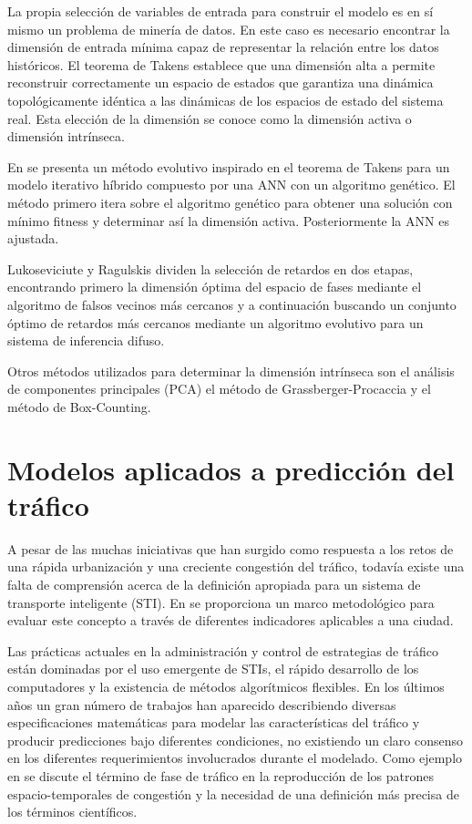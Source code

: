 \documentclass{llncs}
\begin{document}
La propia selección de variables de entrada para construir el modelo es en sí mismo un problema de minería de datos. En este caso es necesario encontrar la dimensión de entrada mínima capaz de representar la relación entre los datos históricos. El teorema de Takens \cite{Takens1981366} establece que una dimensión alta a permite reconstruir correctamente un espacio de estados que garantiza una dinámica topológicamente idéntica a las dinámicas de los espacios de estado del sistema real. Esta elección de la dimensión se conoce como la dimensión activa \cite{Tanaka} o dimensión intrínseca.

En \cite{Ferreira} se presenta un método evolutivo inspirado en el teorema de Takens para un modelo iterativo híbrido compuesto por una ANN con un algoritmo genético. El método primero itera sobre el algoritmo genético para obtener una solución con mínimo fitness y determinar así la dimensión activa. Posteriormente la ANN es ajustada. 

Lukoseviciute y Ragulskis \cite{} dividen la selección de retardos en dos etapas, encontrando primero la dimensión óptima del espacio de fases mediante el algoritmo de falsos vecinos más cercanos y a continuación buscando un conjunto óptimo de retardos más cercanos mediante un algoritmo evolutivo para un sistema de inferencia difuso.

Otros métodos utilizados para determinar la dimensión intrínseca son el análisis de componentes principales (PCA) el método de Grassberger-Procaccia y  el método de Box-Counting. 

\section{Modelos aplicados a predicción del tráfico}

A pesar de las muchas iniciativas que han surgido como respuesta a los retos de una rápida urbanización y una creciente congestión del tráfico, todavía existe una falta de comprensión acerca de la definición apropiada para un sistema de transporte inteligente (STI). En \cite{Debnath201447} se proporciona un marco metodológico para evaluar este concepto a través de diferentes indicadores aplicables a una ciudad. 

Las prácticas actuales en la administración y control de estrategias de tráfico están dominadas por el uso emergente de STIs, el rápido desarrollo de los computadores y la existencia de métodos algorítmicos flexibles. En los últimos años un gran número de trabajos han aparecido describiendo diversas especificaciones matemáticas para modelar las características del tráfico y producir predicciones bajo diferentes condiciones, no existiendo un claro consenso en los diferentes requerimientos involucrados durante el modelado.  Como ejemplo en \cite{Treiber2010983} se discute el término de fase de tráfico en la reproducción de los patrones espacio-temporales de congestión y la necesidad de una definición más precisa de los términos científicos. 
\end{document}
